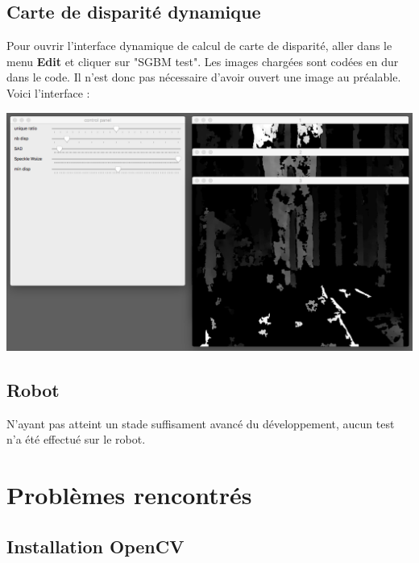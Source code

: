 \documentclass[a4paper]{article}
\begin{document}
\newpage
\subsection*{Carte de disparité dynamique}

Pour ouvrir l'interface dynamique de calcul de carte de disparité, aller dans le
menu \textbf{Edit} et cliquer sur "SGBM test". Les images chargées sont codées en
dur dans le code. Il n'est donc pas nécessaire d'avoir ouvert une image au préalable. \\
Voici l'interface : \\[0.4cm]

\centerline{\includegraphics[width=\textwidth,height=\textheight,keepaspectratio]{img/6.png}}

\subsection*{Robot}

N'ayant pas atteint un stade suffisament avancé du développement, aucun test n'a
été effectué sur le robot.


\newpage
\section{Problèmes rencontrés}

\subsection*{Installation OpenCV}
\end{document}
